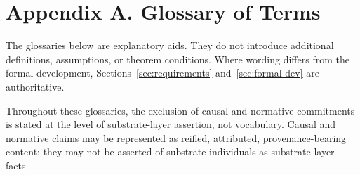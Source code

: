\clearpage
\section*{Appendix A. Glossary of Terms}

The glossaries below are explanatory aids.
They do not introduce additional definitions, assumptions, or theorem conditions.
Where wording differs from the formal development,
Sections~\ref{sec:requirements} and~\ref{sec:formal-dev}
are authoritative.

Throughout these glossaries, the exclusion of causal and normative
commitments is stated at the level of substrate-layer assertion,
not vocabulary.
Causal and normative claims may be represented as
reified, attributed, provenance-bearing content;
they may not be asserted of substrate individuals
as substrate-layer facts.




